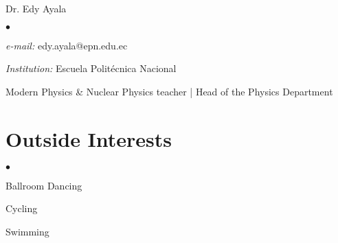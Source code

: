 \documentclass[margin,line]{res}
\newenvironment{list1}{
  \begin{list}{\ding{113}}{%
      \setlength{\itemsep}{0in}
      \setlength{\parsep}{0in} \setlength{\parskip}{0in}
      \setlength{\topsep}{0in} \setlength{\partopsep}{0in} 
      \setlength{\leftmargin}{0.17in}}}{\end{list}}
\newenvironment{list2}{
  \begin{list}{$\bullet$}{%
      \setlength{\itemsep}{0in}
      \setlength{\parsep}{0in} \setlength{\parskip}{0in}
      \setlength{\topsep}{0in} \setlength{\partopsep}{0in} 
      \setlength{\leftmargin}{0.2in}}}{\end{list}}
\begin{document}
\begin{resume}
 \begin{list1}
  \item[] Dr. Edy Ayala
  \begin{list2}
   \item {\it e-mail:} edy.ayala@epn.edu.ec
   \item {\it Institution:} Escuela Politécnica Nacional
   \item Modern Physics \& Nuclear Physics teacher | Head of the Physics Department
  \end{list2}
 \end{list1}
 



\section{\sc Outside Interests}
 \begin{list2}
  \item Ballroom Dancing
  \item Cycling
  \item Swimming
 \end{list2}

\end{resume}
\end{document}
